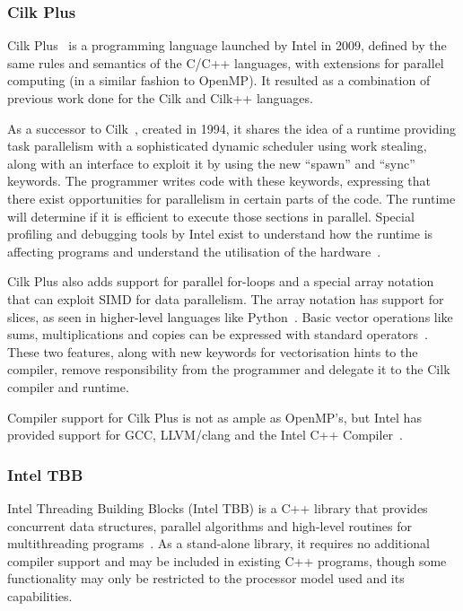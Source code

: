 \subsubsection{Cilk Plus}

Cilk Plus~\cite{robison2012parallel} is a programming language launched by Intel in 2009, defined by the same rules and semantics of the C/C++ languages, with extensions for parallel computing (in a similar fashion to OpenMP). It resulted as a combination of previous work done for the Cilk and Cilk++ languages.

As a successor to Cilk~\cite{frigo1998implementation}, created in 1994, it shares the idea of a runtime providing task parallelism with a sophisticated dynamic scheduler using work stealing, along with an interface to exploit it by using the new ``spawn'' and ``sync'' keywords. The programmer writes code with these keywords, expressing that there exist opportunities for parallelism in certain parts of the code. The runtime will determine if it is efficient to execute those sections in parallel. Special profiling and debugging tools by Intel exist to understand how the runtime is affecting programs and understand the utilisation of the hardware~\cite{1_cilkplus_2015}.

Cilk Plus also adds support for parallel for-loops and a special array notation that can exploit SIMD for data parallelism. The array notation has support for slices, as seen in higher-level languages like Python~\cite{2_wikipedia_2015}. Basic vector operations like sums, multiplications and copies can be expressed with standard operators~\cite{3_cilkplus_2012}. These two features, along with new keywords for vectorisation hints to the compiler, remove responsibility from the programmer and delegate it to the Cilk compiler and runtime.

Compiler support for Cilk Plus is not as ample as OpenMP's, but Intel has provided support for GCC, LLVM/clang and the Intel C++ Compiler~\cite{3_wikipedia_2015}.

\subsubsection{Intel TBB}

Intel Threading Building Blocks (Intel TBB) is a C++ library that provides concurrent data structures, parallel algorithms and high-level routines for multithreading programs~\cite{tousimojarad2014comparison}. As a stand-alone library, it requires no additional compiler support and may be included in existing C++ programs, though some functionality may only be restricted to the processor model used and its capabilities.

